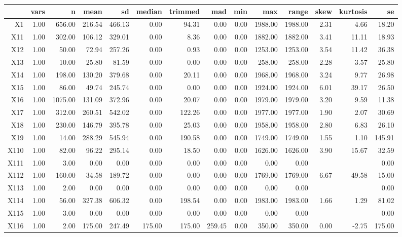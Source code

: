 % 
\begin{tabular}{rrrrrrrrrrrrrr}
  \hline
 & vars & n & mean & sd & median & trimmed & mad & min & max & range & skew & kurtosis & se \\ 
  \hline
X1 & 1.00 & 656.00 & 216.54 & 466.13 & 0.00 & 94.31 & 0.00 & 0.00 & 1988.00 & 1988.00 & 2.31 & 4.66 & 18.20 \\ 
  X11 & 1.00 & 302.00 & 106.12 & 329.01 & 0.00 & 8.36 & 0.00 & 0.00 & 1882.00 & 1882.00 & 3.41 & 11.11 & 18.93 \\ 
  X12 & 1.00 & 50.00 & 72.94 & 257.26 & 0.00 & 0.93 & 0.00 & 0.00 & 1253.00 & 1253.00 & 3.54 & 11.42 & 36.38 \\ 
  X13 & 1.00 & 10.00 & 25.80 & 81.59 & 0.00 & 0.00 & 0.00 & 0.00 & 258.00 & 258.00 & 2.28 & 3.57 & 25.80 \\ 
  X14 & 1.00 & 198.00 & 130.20 & 379.68 & 0.00 & 20.11 & 0.00 & 0.00 & 1968.00 & 1968.00 & 3.24 & 9.77 & 26.98 \\ 
  X15 & 1.00 & 86.00 & 49.74 & 245.74 & 0.00 & 0.00 & 0.00 & 0.00 & 1924.00 & 1924.00 & 6.01 & 39.17 & 26.50 \\ 
  X16 & 1.00 & 1075.00 & 131.09 & 372.96 & 0.00 & 20.07 & 0.00 & 0.00 & 1979.00 & 1979.00 & 3.20 & 9.59 & 11.38 \\ 
  X17 & 1.00 & 312.00 & 260.51 & 542.02 & 0.00 & 122.26 & 0.00 & 0.00 & 1977.00 & 1977.00 & 1.90 & 2.07 & 30.69 \\ 
  X18 & 1.00 & 230.00 & 146.79 & 395.78 & 0.00 & 25.03 & 0.00 & 0.00 & 1958.00 & 1958.00 & 2.80 & 6.83 & 26.10 \\ 
  X19 & 1.00 & 14.00 & 288.29 & 545.94 & 0.00 & 190.58 & 0.00 & 0.00 & 1749.00 & 1749.00 & 1.55 & 1.10 & 145.91 \\ 
  X110 & 1.00 & 82.00 & 96.22 & 295.14 & 0.00 & 18.50 & 0.00 & 0.00 & 1626.00 & 1626.00 & 3.90 & 15.67 & 32.59 \\ 
  X111 & 1.00 & 3.00 & 0.00 & 0.00 & 0.00 & 0.00 & 0.00 & 0.00 & 0.00 & 0.00 &  &  & 0.00 \\ 
  X112 & 1.00 & 160.00 & 34.58 & 189.72 & 0.00 & 0.00 & 0.00 & 0.00 & 1769.00 & 1769.00 & 6.67 & 49.58 & 15.00 \\ 
  X113 & 1.00 & 2.00 & 0.00 & 0.00 & 0.00 & 0.00 & 0.00 & 0.00 & 0.00 & 0.00 &  &  & 0.00 \\ 
  X114 & 1.00 & 56.00 & 327.38 & 606.32 & 0.00 & 198.54 & 0.00 & 0.00 & 1983.00 & 1983.00 & 1.66 & 1.29 & 81.02 \\ 
  X115 & 1.00 & 3.00 & 0.00 & 0.00 & 0.00 & 0.00 & 0.00 & 0.00 & 0.00 & 0.00 &  &  & 0.00 \\ 
  X116 & 1.00 & 2.00 & 175.00 & 247.49 & 175.00 & 175.00 & 259.45 & 0.00 & 350.00 & 350.00 & 0.00 & -2.75 & 175.00 \\ 
   \hline
\end{tabular}

